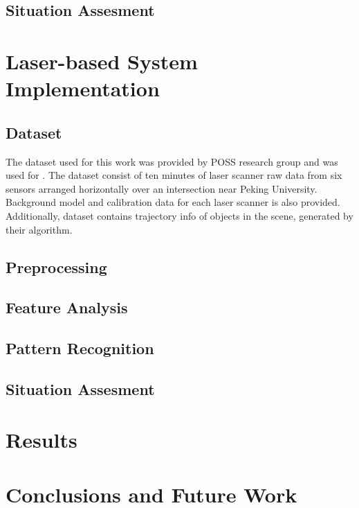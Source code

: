 \documentclass[10pt,twocolumn,letterpaper]{article}
\begin{document}
\subsection{Situation Assesment}

\section{Laser-based System Implementation}

\subsection{Dataset}
 The dataset used for this work was provided by POSS research group and was used for \cite{Zhao2009}. The dataset consist of ten minutes of laser scanner raw data from six sensors arranged horizontally over an intersection near Peking University. Background model and calibration data for each laser scanner is also provided. Additionally, dataset contains trajectory info of objects in the scene, generated by their algorithm.
 
\subsection{Preprocessing}

\subsection{Feature Analysis}
\subsection{Pattern Recognition}
\subsection{Situation Assesment}

\section{Results}

\section{Conclusions and Future Work}

{\small


}
\end{document}
